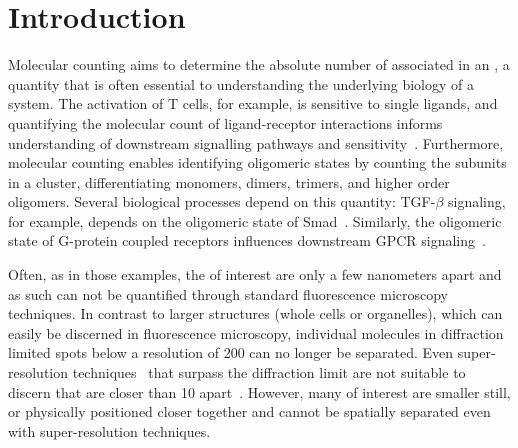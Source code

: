 \section{Introduction}



%
Molecular counting aims to determine the absolute number of \smallobjects
associated in an \object, a quantity that is often essential to understanding
the underlying biology of a system.
  The activation of T cells, for example, is sensitive to single ligands, and
  quantifying the molecular count of ligand-receptor interactions informs
  understanding of downstream signalling pathways and
  sensitivity~\citep{irvine_2002}.
  Furthermore, molecular counting enables identifying oligomeric states by
  counting the subunits in a cluster, differentiating monomers, dimers,
  trimers, and higher order oligomers.
  Several biological processes depend on this quantity: TGF-$\beta$ signaling,
  for example, depends on the oligomeric state of Smad~\citep{inman_2002,
  moustakas_2002}.
  Similarly, the oligomeric state of G-protein coupled receptors influences
  downstream GPCR signaling~\citep{felce_2018, breitwieser_2004}.

%
Often, as in those examples, the \smallobjects of interest are only a few
nanometers apart and as such can not be quantified through standard fluorescence
microscopy techniques.
  In contrast to larger structures (whole cells or organelles), which can
  easily be discerned in fluorescence microscopy, individual molecules in
  diffraction limited spots below a resolution of 200 \nanometer can no longer
  be separated.
  Even super-resolution techniques~\citep{betzig_2006,rust_2006} that surpass
  the diffraction limit are not suitable to discern \smallobjects that are
  closer than 10 \nanometer apart~\citep{valli_seeing_2021}.
  However, many \objects of interest are smaller still, or physically
  positioned closer together and cannot be spatially separated even with
  super-resolution techniques.

